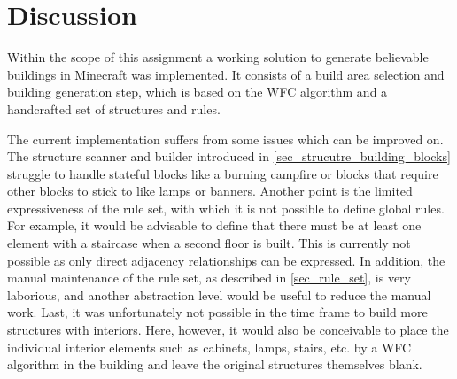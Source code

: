 \documentclass[
oneside,
fontsize=11pt
]{scrartcl}
\begin{document}
\newpage
\section{Discussion}
Within the scope of this assignment a working solution 
to generate believable buildings in Minecraft was implemented.
It consists of a build area selection and building generation step, 
which is based on the WFC algorithm and a handcrafted set of structures and rules.

The current implementation suffers from some issues which can be improved on.
The structure scanner and builder introduced in \autoref{sec_strucutre_building_blocks} 
struggle to handle stateful blocks like a burning campfire 
or blocks that require other blocks to stick to like lamps or banners.
Another point is the limited expressiveness of the rule set, with which it is not possible to define global rules. 
For example, it would be advisable to define that there must be at least one element with a staircase when a second floor is built.
This is currently not possible as only direct adjacency relationships can be expressed.
In addition, the manual maintenance of the rule set, as described in \autoref{sec_rule_set}, 
is very laborious, and another abstraction level would be useful to reduce the manual work. 
Last, it was unfortunately not possible in the time frame to build more structures with interiors. 
Here, however, it would also be conceivable to place the individual interior elements 
such as cabinets, lamps, stairs, etc. by a WFC algorithm in the building and leave the original structures themselves blank. 








\newpage
\appendix  %




\end{document}
